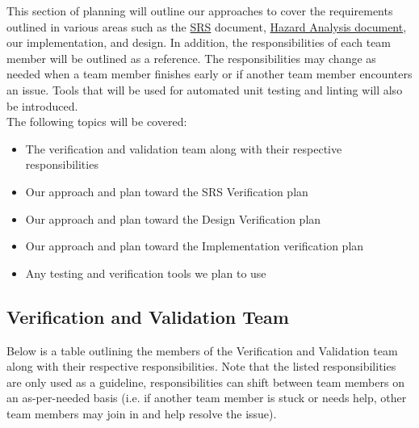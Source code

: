 \documentclass[12pt, titlepage]{article}
\begin{document}

  This section of planning will outline our approaches to cover the requirements outlined in various areas such as the \href{../SRS/SRS.pdf}{SRS} document, \href{../HazardAnalysis/HazardAnalysis.pdf}{Hazard Analysis document}, our implementation, and design. In addition, the responsibilities of each team member will be outlined as a reference. The responsibilities may change as needed when a team member finishes early or if another team member encounters an issue. 
  Tools that will be used for automated unit testing and linting will also be introduced.\\

  The following topics will be covered:

  \begin{itemize}
    \item The verification and validation team along with their respective responsibilities
    \item Our approach and plan toward the SRS Verification plan
    \item Our approach and plan toward the Design Verification plan
    \item Our approach and plan toward the Implementation verification plan
    \item Any testing and verification tools we plan to use
  \end{itemize}


\subsection{Verification and Validation Team}


  Below is a table outlining the members of the Verification and Validation team along with their respective responsibilities.
  Note that the listed responsibilities are only used as a guideline, responsibilities can shift between team members on an as-per-needed basis (i.e. if another team member is stuck or needs help, other team members may join in and help resolve the issue).
\end{document}
